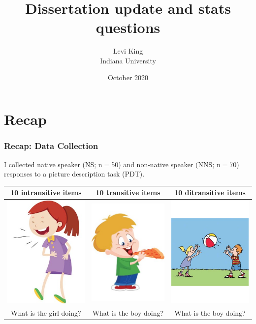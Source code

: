 \documentclass[xcolor={dvipsnames}]{beamer}
\title{Dissertation update and stats questions}
\author[Levi King]{Levi King\\
Indiana University  }
\date{October 2020}
\begin{document}
\maketitle

\section{Recap}
\begin{frame}
\frametitle{Recap: Data Collection}
\small
I collected native speaker (NS; n$=$50) and non-native speaker (NNS; n$=$70) responses to a picture description task (PDT).
\begin{table}[width=.8\columnwidth]\tiny
\begin{center}
\begin{tabular}{|c|c|c|}
\hline
10 intransitive items & 10 transitive items & 10 ditransitive items \\
\hline
{\includegraphics[width=0.2\columnwidth]{figures/I20.jpg}} & {\includegraphics[width=0.2\columnwidth]{figures/I02.jpg}} & {\includegraphics[width=0.25\columnwidth]{figures/I21.jpg}} \\
\hline
What is the girl doing? & What is the boy doing? & What is the boy doing? \\
\hline
\end{tabular}
\end{center}
\end{table}
\medskip
\end{frame}
\end{document}
